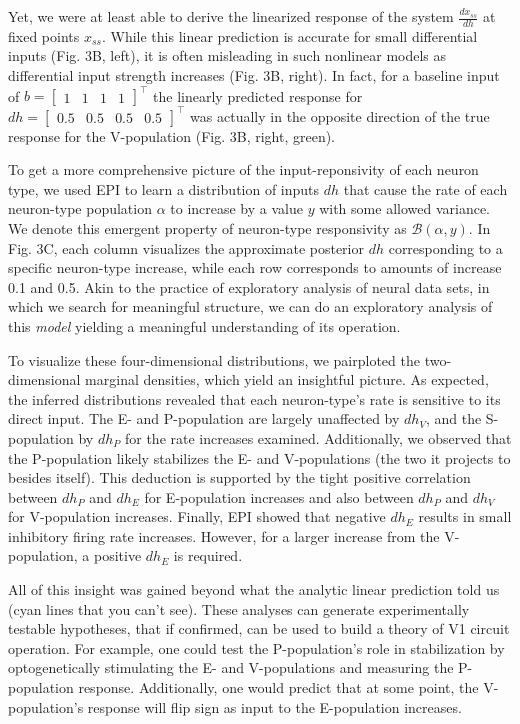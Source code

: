 \documentclass[11pt]{article}
\begin{document}
Yet, we were at least able to derive the linearized response of the system $\frac{dx_{ss}}{dh}$ at fixed points $x_{ss}$.  
While this linear prediction is accurate for small differential inputs (Fig. 3B, left), it is often misleading in such nonlinear models as differential input strength increases (Fig. 3B, right). In fact, for a baseline input of $b = \begin{bmatrix} 1 & 1 & 1 & 1 \end{bmatrix}^\top$ the linearly predicted response for $dh = \begin{bmatrix} 0.5 & 0.5 & 0.5 & 0.5 \end{bmatrix}^\top$ was actually in the opposite direction of the true response for the V-population (Fig. 3B, right, green).

To get a more comprehensive picture of the input-reponsivity of each neuron type, we used EPI to learn a distribution of inputs $dh$ that cause the rate of each neuron-type population $\alpha$ to increase by a value $y$ with some allowed variance.  We denote this emergent property of neuron-type responsivity as $\mathcal{B}(\alpha, y)$.  In Fig. 3C, each column visualizes the approximate posterior $dh$ corresponding to a specific neuron-type increase, while each row corresponds to amounts of increase 0.1 and 0.5.  Akin to the practice of exploratory analysis of neural data sets, in which we search for meaningful structure, we can do an exploratory analysis of this \emph{model} yielding a meaningful understanding of its operation.

To visualize these four-dimensional distributions, we pairploted the two-dimensional marginal densities, which yield an insightful picture.  As expected, the inferred distributions revealed that each neuron-type's rate is sensitive to its direct input.  The E- and P-population are largely unaffected by $dh_V$, and the S-population by $dh_P$ for the rate increases examined.  Additionally, we observed that the P-population likely stabilizes the E- and V-populations (the two it projects to besides itself).  This deduction is supported by the tight positive correlation between $dh_P$ and $dh_E$ for E-population increases and also between $dh_P$ and $dh_V$ for V-population increases.  Finally, EPI showed that negative $dh_E$ results in small inhibitory firing rate increases.  However, for a larger increase from the V-population, a positive $dh_E$ is required.

All of this insight was gained beyond what the analytic linear prediction told us (cyan lines that you can't see).  These analyses can generate experimentally testable hypotheses, that if confirmed, can be used to build a theory of V1 circuit operation.  For example, one could test the P-population's role in stabilization by optogenetically stimulating the E- and V-populations and measuring the P-population response. Additionally, one would predict that at some point, the V-population's response will flip sign as input to the E-population increases.
\end{document}
